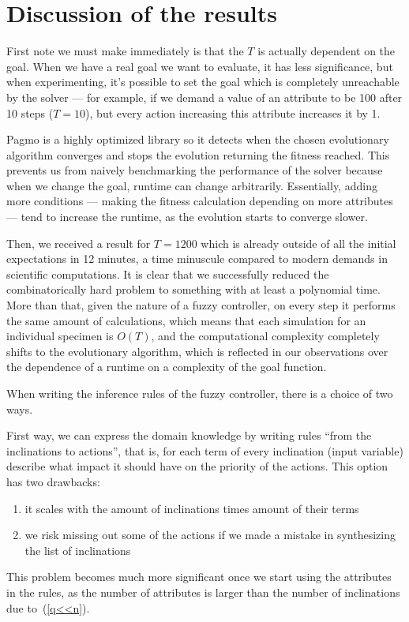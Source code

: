 \documentclass[12pt, a4paper]{report}
\begin{document}
	
	\section{Discussion of the results}

	First note we must make immediately is that the $T$ is actually dependent on the goal.
	When we have a real goal we want to evaluate, it has less significance, but when experimenting, it's possible to set the goal which is completely unreachable by the solver --- for example, if we demand a value of an attribute to be 100 after 10 steps ($T = 10$), but every action increasing this attribute increases it by 1.

	Pagmo is a highly optimized library so it detects when the chosen evolutionary algorithm converges and stops the evolution returning the fitness reached.
	This prevents us from naively benchmarking the performance of the solver because when we change the goal, runtime can change arbitrarily.
	Essentially, adding more conditions --- making the fitness calculation depending on more attributes --- tend to increase the runtime, as the evolution starts to converge slower.

	Then, we received a result for $T = 1200$ which is already outside of all the initial expectations in 12 minutes, a time minuscule compared to modern demands in scientific computations.
	It is clear that we successfully reduced the combinatorically hard problem to something with at least a polynomial time.
	More than that, given the nature of a fuzzy controller, on every step it performs the same amount of calculations, which means that each simulation for an individual specimen is $O(T)$, and the computational complexity completely shifts to the evolutionary algorithm, which is reflected in our observations over the dependence of a runtime on a complexity of the goal function.

	When writing the inference rules of the fuzzy controller, there is a choice of two ways.
	
	First way, we can express the domain knowledge by writing rules ``from the inclinations to actions'', that is, for each term of every inclination (input variable) describe what impact it should have on the priority of the actions.
	This option has two drawbacks:
	\begin{enumerate}
		\item it scales with the amount of inclinations times amount of their terms
		\item we risk missing out some of the actions if we made a mistake in synthesizing the list of inclinations
	\end{enumerate}
	This problem becomes much more significant once we start using the attributes in the rules, as the number of attributes is larger than the number of inclinations due to~(\ref{q<<n}).
	
\end{document}
